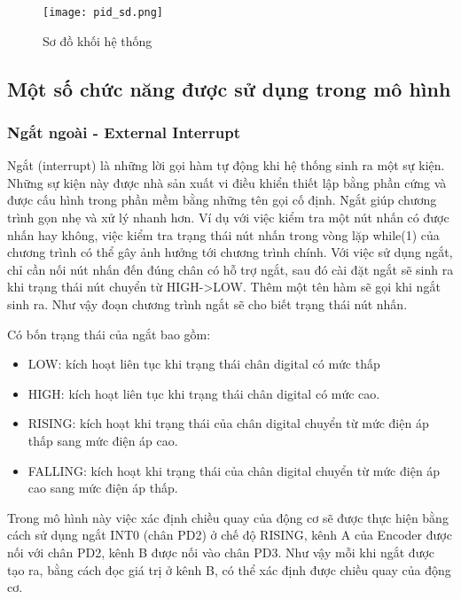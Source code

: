 \begin{figure}[h!]
	\centering
	\texttt{[image: pid\_sd.png]}
	\caption[Sơ đồ khối hệ thống]{Sơ đồ khối hệ thống}
	\label{fig:Sơ đồ khối hệ thống}
\end{figure}


\subsection{Một số chức năng được sử dụng trong mô hình}
\subsubsection{Ngắt ngoài - External Interrupt}

Ngắt (interrupt) là những lời gọi hàm tự động khi hệ thống sinh ra một sự kiện. Những sự kiện này được nhà sản xuất vi điều khiển thiết lập bằng phần cứng và được cấu hình trong phần mềm bằng những tên gọi cố định. Ngắt giúp chương trình gọn nhẹ và xử lý nhanh hơn. Ví dụ với việc kiểm tra một nút nhấn có được nhấn hay không, việc kiểm tra trạng thái nút nhấn trong vòng lặp while(1) của chương trình có thể gây ảnh hưởng tới chương trình chính. Với việc sử dụng ngắt, chỉ cần nối nút nhấn đến đúng chân có hỗ trợ ngắt, sau đó cài đặt ngắt sẽ sinh ra khi trạng thái nút chuyển từ HIGH->LOW. Thêm một tên hàm sẽ gọi khi ngắt sinh ra. Như vậy đoạn chương trình ngắt sẽ cho biết trạng thái nút nhấn.

Có bốn trạng thái của ngắt bao gồm:

\begin{itemize}
	
	\item LOW: kích hoạt liên tục khi trạng thái chân digital có mức thấp
	\item HIGH: kích hoạt liên tục khi trạng thái chân digital có mức cao.
	\item RISING: kích hoạt khi trạng thái của chân digital chuyển từ mức điện áp thấp sang mức điện áp cao.
	\item FALLING: kích hoạt khi trạng thái của chân digital chuyển từ mức điện áp cao sang mức điện áp thấp.
	
\end{itemize}

Trong mô hình này việc xác định chiều quay của động cơ sẽ được thực hiện bằng cách sử dụng ngắt INT0 (chân PD2) ở chế độ RISING, kênh A của Encoder được nối với chân PD2, kênh B được nối vào chân PD3. Như vậy mỗi khi ngắt được tạo ra, bằng cách đọc giá trị ở kênh B, có thể xác định được chiều quay của động cơ.

